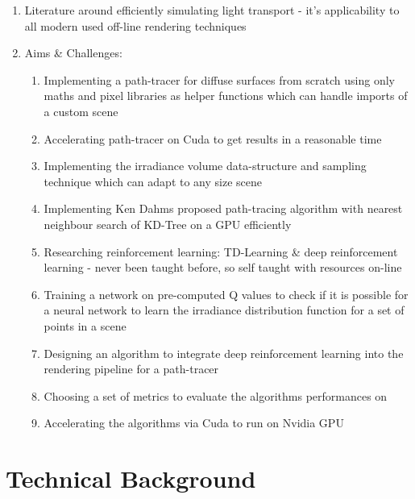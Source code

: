 \documentclass[ %
                    author={Callum Pearce},
                supervisor={Dr. Neill Campbell},
                    degree={MEng},
                     title={How effective are Temporal difference learning methods in reducing the number of zero contribution light paths in Path tracing?},
                  subtitle={},
                      type={research},
                      year={2019} ]{dissertation}
\begin{document}
\begin{enumerate}
\item Literature around efficiently simulating light transport - it's applicability to all 
modern used off-line rendering techniques

\item Aims \& Challenges:

\begin{enumerate}
\item Implementing a path-tracer for diffuse surfaces from scratch using only maths 
and pixel libraries as helper functions which can handle imports of a custom scene
\item Accelerating path-tracer on Cuda to get results in a reasonable time
\item Implementing the irradiance volume data-structure and sampling technique which 
can adapt to any size scene
\item Implementing Ken Dahms proposed path-tracing algorithm with nearest neighbour
 search of KD-Tree on a GPU efficiently 
\item Researching reinforcement learning: TD-Learning \& deep reinforcement learning - 
never been taught before, so self taught with resources on-line
\item Training a network on pre-computed Q values to check if it is possible for a neural
 network to learn the irradiance distribution function for a set of points in a scene
\item Designing an algorithm to integrate deep reinforcement learning into the 
rendering pipeline for a path-tracer
\item Choosing a set of metrics to evaluate the algorithms performances on
\item Accelerating the algorithms via Cuda to run on Nvidia GPU
\end{enumerate}

\end{enumerate}


\chapter{Technical Background}
\label{chap:technical}
\end{document}
